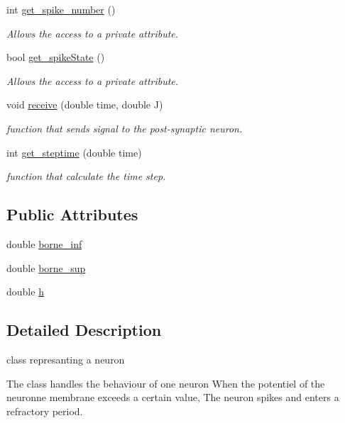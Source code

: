 \begin{DoxyCompactItemize}
int \hyperlink{classNeuron_a901a5dcb2cdf6b624d8b6b515b66ad7d}{get\-\_\-spike\-\_\-number} ()
\begin{DoxyCompactList}\small\item\em Allows the access to a private attribute. \end{DoxyCompactList}\item 
bool \hyperlink{classNeuron_a8bce8864e5fcd328585f01db61e93e71}{get\-\_\-spike\-State} ()
\begin{DoxyCompactList}\small\item\em Allows the access to a private attribute. \end{DoxyCompactList}\item 
void \hyperlink{classNeuron_ac29c1805fb20f82d8d660aa71984c8af}{receive} (double time, double J)
\begin{DoxyCompactList}\small\item\em function that sends signal to the post-\/synaptic neuron. \end{DoxyCompactList}\item 
int \hyperlink{classNeuron_a23f6157b3d03d699414de8c6e1f3312c}{get\-\_\-steptime} (double time)
\begin{DoxyCompactList}\small\item\em function that calculate the time step. \end{DoxyCompactList}\end{DoxyCompactItemize}
\subsection*{Public Attributes}
\begin{DoxyCompactItemize}
\item 
double \hyperlink{classNeuron_ae90ea57c6d9559c8adeb5c46ee6778e1}{borne\-\_\-inf}
\item 
double \hyperlink{classNeuron_af8db865bd7e1f841035fbd99c821dbed}{borne\-\_\-sup}
\item 
double \hyperlink{classNeuron_ae540cc540666b20457f914d7116eea24}{h}
\end{DoxyCompactItemize}


\subsection{Detailed Description}
class represanting a neuron 

The class handles the behaviour of one neuron When the potentiel of the neuronne membrane exceeds a certain value, The neuron spikes and enters a refractory period. 

